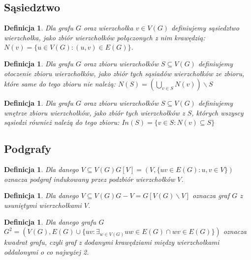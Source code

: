 \documentclass{pracamgr}
\newtheorem{defi}[theorem]{Definicja}
\begin{document}
   \subsection{Sąsiedztwo}
    \begin{defi}\label{sasiedztwo wierzcholka}
     Dla grafu $G$ oraz wierzchołka $v\in V(G)$ definiujemy \emph{sąsiedztwo wierzchołka}, jako zbiór wierzchołków połączonych z nim krawędzią:
     $N(v)=\{u\in V(G):(u,v)\in E(G)\}$.
    \end{defi}
    \vspace*{5pt}
    \begin{defi}\label{otoczenie zbioru wierzcholkow}
     Dla grafu $G$ oraz zbioru wierzchołków $S\subseteq V(G)$ definiujemy \emph{otoczenie zbioru wierzchołków}, jako zbiór tych sąsiadów wierzchołków ze zbioru,
     które same do tego zbioru nie należą: $N(S)=(\bigcup_{v\in S}N(v))\backslash S$
    \end{defi}
    \vspace*{5pt}
    \begin{defi}\label{wnetrze zbioru wierzcholkow}
     Dla grafu $G$ oraz zbioru wierzchołków $S\subseteq V(G)$ definiujemy \emph{wnętrze zbioru wierzchołków}, jako zbiór tych wierzchołków z $S$,
     których wszyscy sąsiedzi również należą do tego zbioru: $In(S)=\{v\in S:N(v)\subseteq S\}$
    \end{defi}
   \subsection{Podgrafy}
    \begin{defi}\label{podgraf indukowany}
     Dla danego $V\subseteq V(G)$\quad $G[V]=(V,\{uv\in E(G):u,v\in V\})$ oznacza \emph{podgraf indukowany} przez podzbiór wierzchołków $V$.
    \end{defi}
    \vspace*{2pt}
    \begin{defi}\label{roznica grafow}
     Dla danego $V\subseteq V(G)$\quad $G-V=G[V(G)\backslash V]$ oznacza \emph{graf $G$ z usuniętymi wierzchołkami $V$}.
    \end{defi}
    \vspace*{2pt}
    \begin{defi}\label{kwadrat grafu}
     Dla danego grafu $G$\newline $G^2=(V(G),E(G)\cup\{uv:\exists_{w\in V(G)}uw\in E(G)\cap wv\in E(G)\})$
     oznacza \emph{kwadrat grafu}, czyli graf z dodanymi krawędziami między wierzchołkami oddalonymi o co najwyżej 2.
    \end{defi}
\end{document}
